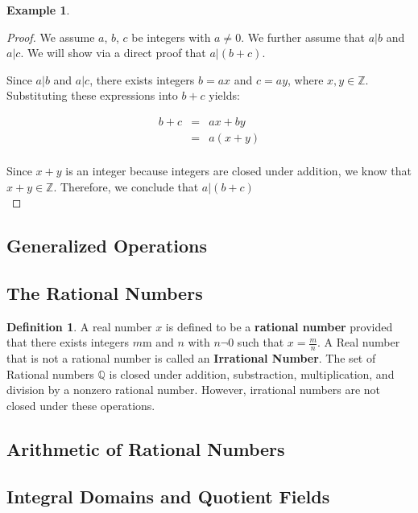 \documentclass{book}
\theoremstyle{definition}
\newtheorem{definition}{Definition}[section]
\newtheorem{example}{Example}[definition]
\theoremstyle{remark}
\newcommand{\bb}[1]{\mathbb{#1}}
\begin{document}
\begin{example}
\begin{proof}
    We assume $a$, $b$, $c$ be integers with $a \neq 0$. We further assume that $a | b$ and $a | c$. We will show via a direct proof that $a | (b + c)$. 
    
    Since $a | b$ and $a | c$, there exists integers $b = ax$ and $c = ay$, where $x, y \in \bb{Z}$. Substituting these expressions into $b + c$ yields:
    
    \begin{eqnarray*}
    	b + c & = & ax + by \nonumber \\	
    	& = & a(x + y) \nonumber \\
    \end{eqnarray*}
    
    Since $x + y$ is an integer because integers are closed under addition, we know that $x + y \in \bb{Z}$. Therefore, we conclude that $a | (b + c)$ \\
\end{proof}
\end{example}


\newpage
\subsection{Generalized Operations}
\subsection{The Rational Numbers}
\begin{definition}
A real number $x$ is defined to be a {\bf rational number} provided that there exists integers $m$m and $n$ with $n \neg 0$ such that $x = \frac{m}{n}$. A Real number that is not a rational number is called an {\bf Irrational Number}. The set of Rational numbers $\mathbb{Q}$ is closed under addition, substraction, multiplication, and division by a nonzero rational number. However, irrational numbers are not closed under these operations. 
\end{definition}




\subsection{Arithmetic of Rational Numbers}
\subsection{Integral Domains and Quotient Fields}
\end{document}
